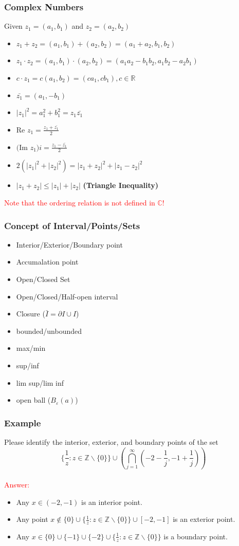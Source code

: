 \documentclass{beamer}
\begin{document}
\begin{frame}
    \frametitle{Complex Numbers}
    \hspace{1em}
    Given $z_1=(a_1,b_1)$ and $z_2=(a_2,b_2)$
\begin{itemize}
    \item $z_1+z_2=(a_1,b_1)+(a_2,b_2)=(a_1+a_2,b_1,b_2)$
    \item $z_1\cdot z_2=(a_1,b_1)\cdot (a_2,b_2)=(a_1a_2-b_1b_2,a_1b_2-a_2b_1)$
    \item $c\cdot z_1=c(a_1,b_2)=(ca_1,cb_1), c\in \mathbb{R} $
    \item $\bar{z_1}=(a_1,-b_1)$
    \item $|z_1|^2=a_1^2+b_1^2=z_1\bar{z_1}$
    \item Re $z_1= \frac{z_1+\bar{z_1}}{2}$
    \item $($Im $z_1 )i= \frac{z_1-\bar{z_1}}{2}$
    \item $2(|z_1|^2+|z_2|^2)=|z_1+z_2|^2+|z_1-z_2|^2$
    \item $|z_1+z_2|\leq |z_1|+|z_2|$ \textbf{(Triangle Inequality)}
\end{itemize}
\textcolor{red}{Note that the ordering relation is not defined in $\mathbb{C}$!}
\end{frame}
\begin{frame}
    \frametitle{Concept of Interval/Points/Sets}
    \begin{itemize}
        \item Interior/Exterior/Boundary point
        \item Accumalation point
        \item Open/Closed Set
        \item Open/Closed/Half-open interval
        \item Closure ($\bar{I}=\partial I \cup I$)
        \item bounded/unbounded
        \item max/min
        \item sup/inf
        \item lim sup/lim inf
        \item open ball ($B_\varepsilon(a)$)
    \end{itemize}
\end{frame}
\begin{frame}
    \frametitle{Example}
        Please identify the interior, exterior, and boundary
        points of the set
        $$\{\frac{1}{z}:z\in \mathbb{Z}\backslash\{0\}\}\cup (\bigcap_{j=1}^\infty(-2-\frac{1}{j},-1+\frac{1}{j}))$$
    \vspace{2em}\\
    \textcolor{red}{Answer:} \\
    \begin{itemize}
        \item Any $x \in (-2, -1)$ is an interior point. 
        \item Any point $x \notin \{0\} \cup \{\frac{1}{z}: z \in \mathbb{Z}\backslash\{0\}\} \cup [-2, -1]$ is an exterior point.
        \item Any $x \in \{0\} \cup \{-1\} \cup \{-2\} \cup \{\frac{1}{z}: z \in \mathbb{Z}\backslash\{0\}\}$ is a boundary point. 
    \end{itemize}
\end{frame}
\end{document}
